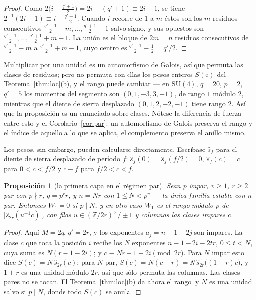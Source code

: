 \documentclass[11pt,a4paper]{article}
\newtheorem{proposition}[theorem]{Proposici\'on}
\theoremstyle{definition}
\newcommand{\SU}{\mathrm{SU}}
\newcommand{\ZZ}{\mathbb{Z}}
\begin{document}
\begin{proof}
Como $2\bigl(i-\tfrac{q'+1}{2}\bigr)=2i-(q'+1)\equiv2i-1$, se tiene
$2^{-1}(2i-1)\equiv i-\tfrac{q'+1}{2}$. Cuando $i$ recorre de $1$ a $m$ \'estos son los $m$ residuos
consecutivos $\tfrac{q'+1}{2}-m,\dots,\tfrac{q'+1}{2}-1$ salvo signo, y sus opuestos son
$\tfrac{q'+1}{2},\dots,\tfrac{q'+1}{2}+m-1$. La uni\'on es el bloque de $2m=n$ residuos
consecutivos de $\tfrac{q'+1}{2}-m$ a $\tfrac{q'+1}{2}+m-1$, cuyo centro es
$\tfrac{q'+1}{2}-\tfrac12=q'/2$.
\end{proof}

Multiplicar por una unidad es un automorfismo de Galois, as\'i que permuta las clases de
residuos; pero no permuta con ellas los pesos enteros $S(c)$ del Teorema~\ref{thm:loc}(b), y el
rango puede cambiar --- en $\SU(4)$, $q=20$, $p=2$, $q'=5$ los momentos del segmento son
$(0,1,-3,3,-1)$, de rango $1$ m\'odulo $2$, mientras que el diente de sierra desplazado
$(0,1,2,-2,-1)$ tiene rango $2$. As\'i que la proposici\'on es un enunciado sobre clases. N\'otese
la diferencia de fuerza entre esto y el Corolario~\ref{cor:par}: un automorfismo de Galois preserva
el rango y el \'indice de aquello a lo que se aplica, el complemento preserva el anillo mismo.

Los pesos, sin embargo, pueden calcularse directamente. Escr\'ibase $\widehat s_f$ para el diente
de sierra desplazado de per\'iodo $f$: $\widehat s_f(0)=\widehat s_f(f/2)=0$, $\widehat s_f(c)=c$
para $0<c<f/2$ y $c-f$ para $f/2<c<f$.

\begin{proposition}[la primera capa en el r\'egimen par]\label{prop:parimp}
Sean $p$ impar, $v\ge1$, $r\ge2$ par con $p\nmid r$, $q=p^vr$, y $n=Nr$ con $1\le N<p^v$ --- la
\'unica familia estable con $n$ par. Entonces $W_1=0$ si $p\mid N$, y en otro caso $W_1$ es el rango
m\'odulo $p$ de $\bigl[\widehat s_{2r}(u^{-1}c)\bigr]$, con filas $u\in(\ZZ/2r)^\times/\pm1$ y
columnas las clases \emph{impares} $c$.
\end{proposition}

\begin{proof}
Aqu\'i $M=2q$, $q'=2r$, y los exponentes $a_j=n-1-2j$ son impares. La clase $c$ que toca la
posici\'on $i$ recibe los $N$ exponentes $n-1-2i-2tr$, $0\le t<N$, cuya suma es $N(r-1-2i)$; y
$c\equiv Nr-1-2i\pmod{2r}$. Para $N$ impar esto dice $S(c)=N\,\widehat s_{2r}(c)$; para $N$ par,
$S(c)=N(c-r)=N\,\widehat s_{2r}\bigl((1+r)c\bigr)$, y $1+r$ es una unidad m\'odulo $2r$, as\'i que
s\'olo permuta las columnas. Las clases pares no se tocan. El Teorema~\ref{thm:loc}(b) da ahora el
rango, y $N$ es una unidad salvo si $p\mid N$, donde todo $S(c)$ se anula.
\end{proof}
\end{document}
